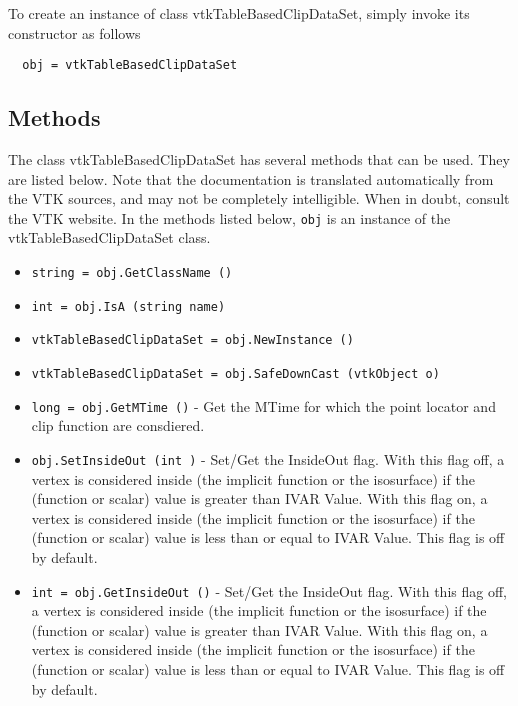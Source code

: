 To create an instance of class vtkTableBasedClipDataSet, simply
invoke its constructor as follows
\begin{verbatim}
  obj = vtkTableBasedClipDataSet
\end{verbatim}
\subsection{Methods}

The class vtkTableBasedClipDataSet has several methods that can be used.
  They are listed below.
Note that the documentation is translated automatically from the VTK sources,
and may not be completely intelligible.  When in doubt, consult the VTK website.
In the methods listed below, \verb|obj| is an instance of the vtkTableBasedClipDataSet class.
\begin{itemize}
\item  \verb|string = obj.GetClassName ()|

\item  \verb|int = obj.IsA (string name)|

\item  \verb|vtkTableBasedClipDataSet = obj.NewInstance ()|

\item  \verb|vtkTableBasedClipDataSet = obj.SafeDownCast (vtkObject o)|

\item  \verb|long = obj.GetMTime ()| -  Get the MTime for which the point locator and clip function are consdiered.

\item  \verb|obj.SetInsideOut (int )| -  Set/Get the InsideOut flag. With this flag off, a vertex is considered
 inside (the implicit function or the isosurface) if the (function or scalar)
 value is greater than IVAR Value. With this flag on, a vertex is considered
 inside (the implicit function or the isosurface) if the (function or scalar)
 value is less than or equal to IVAR Value. This flag is off by default.

\item  \verb|int = obj.GetInsideOut ()| -  Set/Get the InsideOut flag. With this flag off, a vertex is considered
 inside (the implicit function or the isosurface) if the (function or scalar)
 value is greater than IVAR Value. With this flag on, a vertex is considered
 inside (the implicit function or the isosurface) if the (function or scalar)
 value is less than or equal to IVAR Value. This flag is off by default.


\end{itemize}
